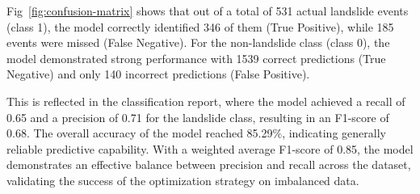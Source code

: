 Fig~\ref{fig:confusion-matrix} shows that out of a total of 531 actual landslide events (class 1), the model correctly identified 346 of them (True Positive), while 185 events were missed (False Negative). For the non-landslide class (class 0), the model demonstrated strong performance with 1539 correct predictions (True Negative) and only 140 incorrect predictions (False Positive).

This is reflected in the classification report, where the model achieved a recall of 0.65 and a precision of 0.71 for the landslide class, resulting in an F1-score of 0.68. The overall accuracy of the model reached 85.29\%, indicating generally reliable predictive capability. With a weighted average F1-score of 0.85, the model demonstrates an effective balance between precision and recall across the dataset, validating the success of the optimization strategy on imbalanced data.
